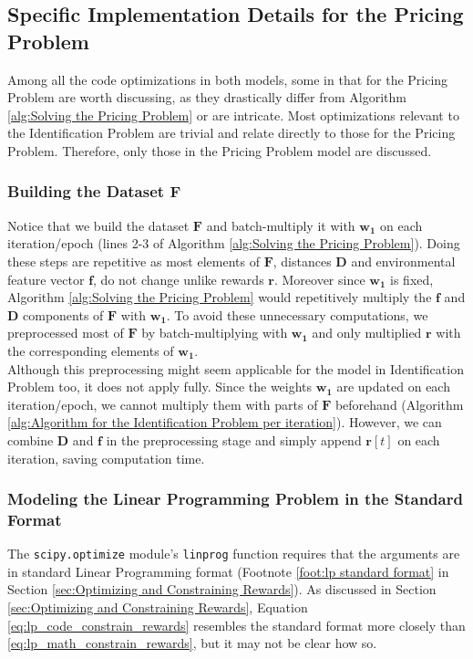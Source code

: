 \documentclass[12pt]{article}
\newcommand{\vect}[1]{\mathbf{#1}}  %
\newcommand{\matr}[1]{\mathbf{#1}}  %
\begin{document}
    \subsection{Specific Implementation Details for the Pricing Problem}
    Among all the code optimizations in both models, some in that for the Pricing Problem are worth discussing, as they drastically differ from Algorithm \ref{alg:Solving the Pricing Problem} or are intricate. Most optimizations relevant to the Identification Problem are trivial and relate directly to those for the Pricing Problem. Therefore, only those in the Pricing Problem model are discussed.
    
    \subsubsection{Building the Dataset $\matr{F}$}
    Notice that we build the dataset $\matr{F}$ and batch-multiply it with $\matr{w_1}$ on each iteration/epoch (lines 2-3 of Algorithm \ref{alg:Solving the Pricing Problem}). Doing these steps are repetitive as most elements of $\matr{F}$, distances $\matr{D}$ and environmental feature vector $\vect{f}$, do not change unlike rewards $\vect{r}$. Moreover since $\matr{w_1}$ is fixed, Algorithm \ref{alg:Solving the Pricing Problem} would repetitively multiply the $\vect{f}$ and $\matr{D}$ components of $\matr{F}$ with $\matr{w_1}$. To avoid these unnecessary computations, we preprocessed most of $\matr{F}$ by batch-multiplying with $\matr{w_1}$ and only multiplied $\vect{r}$ with the corresponding elements of $\matr{w_1}$.\\
    
    Although this preprocessing might seem applicable for the model in Identification Problem too, it does not apply fully. Since the weights $\matr{w_1}$ are updated on each iteration/epoch, we cannot multiply them with parts of $\matr{F}$ beforehand (Algorithm \ref{alg:Algorithm for the Identification Problem per iteration}). However, we can combine $\matr{D}$ and $\vect{f}$ in the preprocessing stage and simply append $\vect{r}[t]$ on each iteration, saving computation time.
    
    \subsubsection{Modeling the Linear Programming Problem in the Standard Format}
    The \texttt{scipy.optimize} module's \texttt{linprog} function requires that the arguments are in standard Linear Programming format (Footnote \ref{foot:lp standard format} in Section \ref{sec:Optimizing and Constraining Rewards}). As discussed in Section \ref{sec:Optimizing and Constraining Rewards}, Equation \ref{eq:lp_code_constrain_rewards} resembles the standard format more closely than \ref{eq:lp_math_constrain_rewards}, but it may not be clear how so.\\
    
\end{document}
